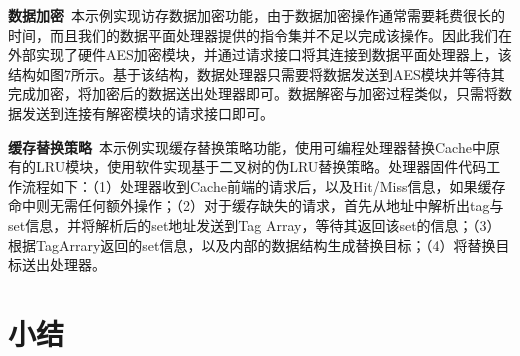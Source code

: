 \textbf{数据加密}\ 本示例实现访存数据加密功能，由于数据加密操作通常需要耗费很长的时间，而且我们的数据平面处理器提供的指令集并不足以完成该操作。因此我们在外部实现了硬件AES加密模块，并通过请求接口将其连接到数据平面处理器上，该结构如图7所示。基于该结构，数据处理器只需要将数据发送到AES模块并等待其完成加密，将加密后的数据送出处理器即可。数据解密与加密过程类似，只需将数据发送到连接有解密模块的请求接口即可。
 
\textbf{缓存替换策略}\ 本示例实现缓存替换策略功能，使用可编程处理器替换Cache中原有的LRU模块，使用软件实现基于二叉树的伪LRU替换策略。处理器固件代码工作流程如下：（1）处理器收到Cache前端的请求后，以及Hit/Miss信息，如果缓存命中则无需任何额外操作；（2）对于缓存缺失的请求，首先从地址中解析出tag与set信息，并将解析后的set地址发送到Tag Array，等待其返回该set的信息；（3）根据TagArrary返回的set信息，以及内部的数据结构生成替换目标；（4）将替换目标送出处理器。


\section{小结}

